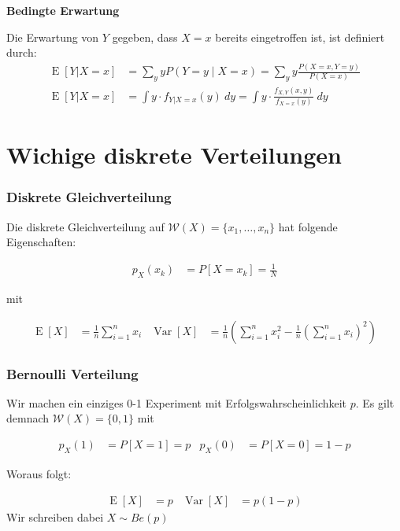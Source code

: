 \documentclass[25pt]{sciposter}
\newcommand{\W}{\mathcal{W}}
\newcommand{\Var}{\operatorname{Var}}
\newcommand{\E}{\operatorname{E}}
\newenvironment{method}[1]{\begin{mdframed}[backgroundcolor=blue!10,innertopmargin=15pt, innerbottommargin=15pt,nobreak=true]
		\textbf{#1 }
	}
	{ 
	\end{mdframed}
}
\begin{document}
\begin{multicols}{3}
\begin{method}{Bedingte Erwartung}
	Die Erwartung von $Y$ gegeben, dass $X=x$ bereits eingetroffen ist, ist definiert durch:
	\begin{align*}
	\E[Y|X=x] &= \sum _{y}yP(Y=y\mid X=x)=\sum _{y}y{\frac {P(X=x,Y=y)}{P(X=x)}}\\
	\E[Y|X=x] &= \int y\cdot  f_{Y|X=x}(y)\  dy = \int y\cdot  \frac{f_{X,Y}(x,y)}{f_{X=x}(y)} \ dy
	\end{align*}
\end{method}



\section{Wichige diskrete Verteilungen}

\subsubsection*{Diskrete Gleichverteilung}
Die diskrete Gleichverteilung auf  $\W(X)=\{x_1,\ldots,x_n\}$ hat folgende Eigenschaften:

\begin{align*}
	p_X(x_k) &= P[X = x_k] = \frac{1}{N}
\end{align*}

mit 

\begin{align*}
	\operatorname {E}[X]&={\frac  {1}{n}}\sum _{{i=1}}^{n}x_{i} & \operatorname {Var}[X]&={\frac  {1}{n}}\left(\sum _{{i=1}}^{n}x_{i}^{2}-{\frac  {1}{n}}\left(\sum _{{i=1}}^{n}x_{i}\right)^{2}\right)
\end{align*}

\subsubsection*{Bernoulli Verteilung}
Wir machen ein einziges 0-1 Experiment mit Erfolgswahrscheinlichkeit $p$. Es gilt demnach $\W(X) = \{0,1\}$ mit 

\begin{align*}
	p_X(1) &= P[X=1] = p & 	p_X(0) &= P[X=0] = 1-p
\end{align*}

Woraus folgt:

\begin{align*}
	\E[X] &= p & \Var[X] &= p(1-p)
\end{align*}
Wir schreiben dabei $X\sim {Be}(p)$


\end{multicols}
\end{document}
